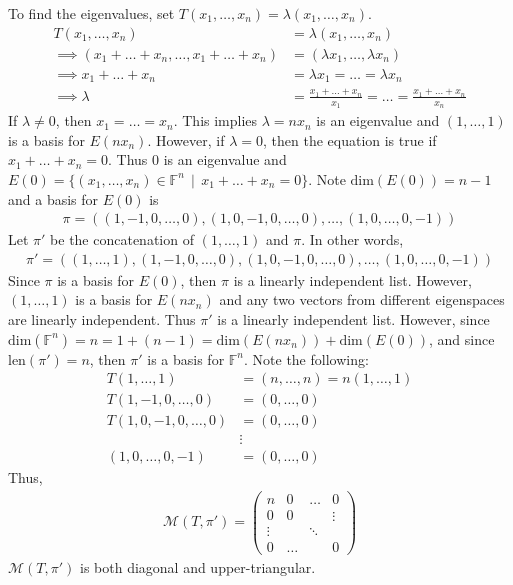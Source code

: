 \documentclass[12pt]{article}
\newcommand{\suchthat}{\, \mid \,}
\begin{document}
	\noindent To find the eigenvalues, set $T(x_1, \dots, x_n) = \lambda(x_1, \dots, x_n)$.
	\begin{align*}
		T(x_1, \dots, x_n) &= \lambda(x_1, \dots, x_n) \\
		\implies (x_1 + \dots + x_n, \dots, x_1 + \dots + x_n) &= (\lambda x_1, \dots, \lambda x_n) \\
		\implies x_1 + \dots + x_n &= \lambda x_1 = \dots = \lambda x_n\\
		\implies \lambda &= \frac{x_1 + \dots + x_n}{x_1} = \dots = \frac{x_1 + \dots + x_n}{x_n}
	\end{align*}
	If $\lambda \neq 0$, then $x_1 = \dots = x_n$.  This implies $\lambda = n x_n$ is an eigenvalue and $(1, \dots, 1)$ is a basis for $E(n x_n)$.  However, if $\lambda = 0$, then the equation is true if $x_1 + \dots + x_n = 0$.  Thus $0$ is an eigenvalue and $E(0) = \{(x_1, \dots, x_n) \in \mathbb{F}^n \suchthat x_1 + \dots + x_n = 0\}$.  Note $\text{dim}(E(0)) = n-1$ and a basis for $E(0)$ is
	\begin{align*}
		\pi = ((1, -1, 0, \dots, 0), (1, 0, -1, 0, \dots, 0), \dots, (1, 0, \dots, 0, -1))
	\end{align*}
	Let $\pi'$ be the concatenation of $(1, \dots, 1)$ and $\pi$.  In other words,
	\begin{align*}
		\pi' = ((1, \dots, 1),(1, -1, 0, \dots, 0), (1, 0, -1, 0, \dots, 0), \dots, (1, 0, \dots, 0, -1))
	\end{align*}
	Since $\pi$ is a basis for $E(0)$, then $\pi$ is a linearly independent list.  However, $(1, \dots, 1)$ is a basis for $E(n x_n)$ and any two vectors from different eigenspaces are linearly independent.  Thus $\pi'$ is a linearly independent list.  However, since $\text{dim}(\mathbb{F}^n) = n = 1 + (n-1) = \text{dim}(E(n x_n)) + \text{dim}(E(0))$, and since $\text{len}(\pi') = n$, then $\pi'$ is a basis for $\mathbb{F}^n$.  Note the following:
	\begin{align*}
		T(1, \dots, 1) &= (n, \dots, n) = n(1, \dots, 1)\\
		T(1, -1, 0, \dots, 0) &= (0, \dots, 0) \\
		T(1, 0, -1, 0, \dots, 0) &= (0, \dots, 0) \\
		&\vdots \\
		(1, 0, \dots, 0, -1) &= (0, \dots, 0)
	\end{align*}
	Thus,
	\begin{align*}
		\mathcal{M}(T, \pi') = \left(\begin{array}{cccc}
			n & 0 & \dots & 0 \\
			0 & 0 & & \vdots \\
			\vdots & & \ddots & \\
			0 & \dots & & 0
			\end{array}\right)
	\end{align*}
	$\mathcal{M}(T, \pi')$ is both diagonal and upper-triangular.
\end{document}
